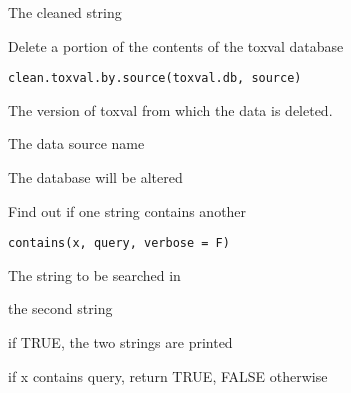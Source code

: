 \documentclass[letterpaper]{book}
\begin{document}
%
\begin{Value}
The cleaned string
\end{Value}
%
\begin{Description}\relax
Delete a portion of the contents of the toxval database
\end{Description}
%
\begin{Usage}
\begin{verbatim}
clean.toxval.by.source(toxval.db, source)
\end{verbatim}
\end{Usage}
%
\begin{Arguments}
\begin{ldescription}
\item[\code{toxval.db}] The version of toxval from which the data is deleted.

\item[\code{source}] The data source name
\end{ldescription}
\end{Arguments}
%
\begin{Value}
The database will be altered
\end{Value}
%
\begin{Description}\relax
Find out if one string contains another
\end{Description}
%
\begin{Usage}
\begin{verbatim}
contains(x, query, verbose = F)
\end{verbatim}
\end{Usage}
%
\begin{Arguments}
\begin{ldescription}
\item[\code{x}] The string to be searched in

\item[\code{query}] the second string

\item[\code{verbose}] if TRUE, the two strings are printed
\end{ldescription}
\end{Arguments}
%
\begin{Value}
if x contains query, return TRUE, FALSE otherwise
\end{Value}
\end{document}
